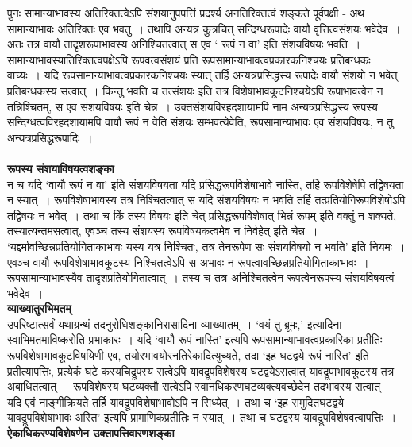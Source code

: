 {पुनः सामान्याभावस्य अतिरिक्तत्वेऽपि संशयानुपपत्तिं प्रदर्श्य अनतिरिक्तत्वं शङ्कते पूर्वपक्षी - अथ सामान्याभावः अतिरिक्तः एव भवतु~। तथापि अन्यत्र कुत्रचित् सन्दिग्धरूपादेः वायौ वृत्तित्वसंशयः भवेदेव~। अतः तत्र वायौ तादृशरूपाभावस्य अनिश्चितत्वात् स एव ‘ रूपं न वा’ इति संशयविषयः भवति~। सामान्याभावस्यातिरिक्तत्वपक्षेऽपि रूपवत्वसंशयं प्रति रूपसामान्याभावत्वप्रकारकनिश्चयः प्रतिबन्धकः वाच्यः~। यदि रूपसामान्याभावत्वप्रकारकनिश्चयः स्यात् तर्हि अन्यत्रप्रसिद्धस्य रूपादेः वायौ संशयो न भवेत् प्रतिबन्धकस्य सत्वात्~। किन्तु भवति च तत्संशयः इति तत्र विशेषाभावकूटनिश्चयेऽपि रूपाभावत्वेन  न तन्निश्चितम्, स एव संशयविषयः इति चेन्न~। उक्तसंशयविरहदशायामपि नाम अन्यत्रप्रसिद्धस्य रूपस्य सन्दिग्धत्वविरहदशायामपि वायौ रूपं न वेति संशयः सम्भवत्येवेति, रूपसामान्याभावः एव संशयविषयः, न तु अन्यत्रप्रसिद्धरूपादिः~।\\ 
~\\[0.2cm]
\textbf{रूपस्य संशयाविषयत्वशङ्का}\\
न च यदि ‘वायौ रूपं न वा’ इति संशयविषयता यदि प्रसिद्धरूपविशेषाभावे नास्ति, तर्हि रूप\-विशेषेपि तद्विषयता न स्यात्~। रूपविशेषाभावस्य तत्र निश्चितत्वात् स यदि संशयविषयः न भवति तर्हि तत्प्रतियोगिरूपविशेषोऽपि तद्विषयः न भवेत्~। तथा च किं तस्य विषयः इति चेत् प्रसिद्धरूपविशेषात् भिन्नं रूपम् इति वक्तुं न शक्यते, तस्यात्यन्तमसत्वात्, एवञ्च तस्य संशयस्य रूपविषयकत्वमेव न निर्वहेत् इति चेन्न~। ‘यद्दर्मावच्छिन्नप्रतियोगिताकाभावः यस्य यत्र निश्चितः, तत्र तेनरूपेण सः  संशयविषयो न भवति’ इति नियमः~। एवञ्च वायौ रूपविशेषाभावकूटस्य निश्चितत्वेऽपि स अभावः न रूपत्वावच्छिन्नप्रतियोगिताकाभावः~। रूपसामान्याभावस्यैव तादृशप्रतियोगितात्वात्~। तस्य च तत्र अनिश्चितत्वेन रूपत्वेन\break रूपस्य संशयविषयत्वं भवेदेव~।
~\\[0.2cm]
\textbf{व्याख्यातुरभिमतम्}\\
उपरिष्टात्सर्वं यथाग्रन्थं तदनुरोधिशङ्कानिरासादिना व्याख्यातम्~। ‘वयं तु ब्रूमः,’ इत्यादिना स्वाभिमतमाविष्करोति प्रभाकारः~। यदि ‘वायौ रूपं नास्ति’ इत्यपि रूपसामान्याभावत्वप्रकारिका प्रतीतिः रूपविशेषाभावकूटविषयिणी एव, तयोरभावयोरनतिरेकादित्युच्यते, तदा ‘इह घटद्वये रूपं नास्ति’ इति प्रतीत्यापत्तिः, प्रत्येकं घटे कस्यचिद्रूपस्य सत्वेऽपि यावद्रूपविशेषस्य घटद्वयेऽसत्वात् यावद्रूपाभावकूटस्य तत्र अबाधितत्वात्~। रूपविशेषस्य घटव्यक्तौ सत्वेऽपि स्वानधिकरणघटव्यक्त्यवच्छेदेन तदभावस्य सत्वात्~। यदि एवं नाङ्गीक्रियते तर्हि यावद्रूपविशेषाभावोऽपि न सिध्येत्~। तथा च ‘इह समुदितघटद्वये यावद्रूपविशेषाभावः अस्ति’ इत्यपि प्रामाणिकप्रतीतिः न स्यात्~। तथा च घटद्वस्य यावद्रूपविशेषवत्वापत्तिः~।
~\\[0.2cm]
\textbf{ऐकाधिकरण्यविशेषणेन उक्तापत्तिवारणशङ्का}\\
}
